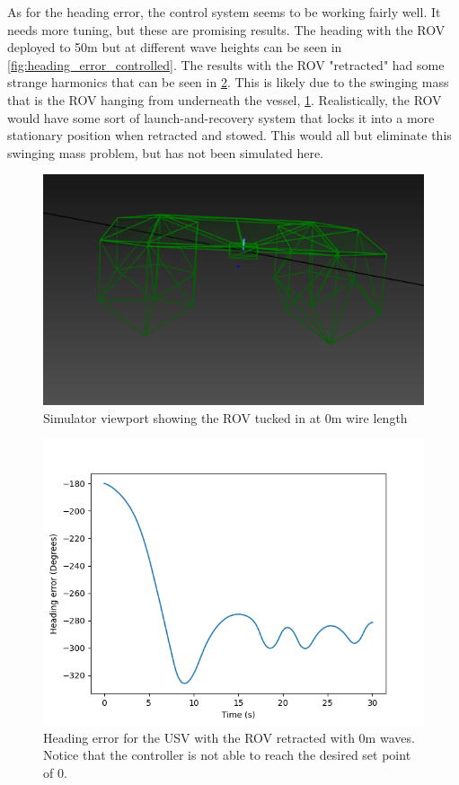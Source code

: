 \documentclass[class=article, crop=false]{standalone}
\begin{document}
As for the heading error, the control system seems to be working fairly well. It needs more tuning, but these are promising results. The heading with the ROV deployed to 50m but at different wave heights can be seen in \cref{fig:heading_error_controlled}. The results with the ROV "retracted" had some strange harmonics that can be seen in \cref{fig:heading_swinging}. This is likely due to the swinging mass that is the ROV hanging from underneath the vessel, \cref{fig:ballsack}. Realistically, the ROV would have some sort of launch-and-recovery system that locks it into a more stationary position when retracted and stowed. This would all but eliminate this swinging mass problem, but has not been simulated here.

\begin{figure}
    \centering
    \includegraphics{sim_rov_at_0m}
    \caption{Simulator viewport showing the ROV tucked in at 0m wire length}
    \label{fig:ballsack}
\end{figure}

\begin{figure}
    \centering
    \includegraphics{scenario1/rov-0m/0.0m/usv_heading_error_controlled}
    \caption{Heading error for the USV with the ROV retracted with 0m waves. Notice that the controller is not able to reach the desired set point of 0.}
    \label{fig:heading_swinging}
\end{figure}
\end{document}

